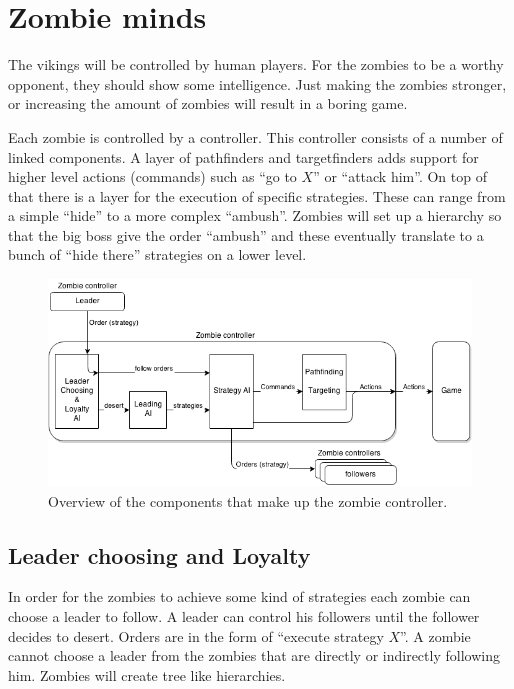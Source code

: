 \section{Zombie minds}

The vikings will be controlled by human players. For the zombies to be a worthy opponent, they should show some intelligence. Just making the zombies stronger, or increasing the amount of zombies will result in a boring game.

Each zombie is controlled by a controller. This controller consists of a number of linked components. A layer of pathfinders and targetfinders adds support for higher level actions (commands) such as ``go to $X$'' or ``attack him''. On top of that there is a layer for the execution of specific strategies. These can range from a simple ``hide'' to a more complex ``ambush''. Zombies will set up a hierarchy so that the big boss give the order ``ambush'' and these eventually translate to a bunch of ``hide there'' strategies on a lower level.

\begin{figure}[!htb]
	\centering
	\includegraphics[width=\textwidth]{zombie-controller.png}
	\caption{Overview of the components that make up the zombie controller.}
\end{figure}

\subsection{Leader choosing and Loyalty}
In order for the zombies to achieve some kind of strategies each zombie can choose a leader to follow. A leader can control his followers until the follower decides to desert. Orders are in the form of ``execute strategy $X$''. A zombie cannot choose a leader from the zombies that are directly or indirectly following him. Zombies will create tree like hierarchies.

